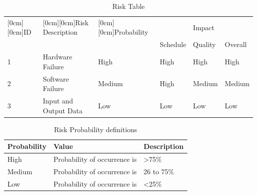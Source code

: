\documentclass[12pt,a4paper]
{article}
\numberwithin{table}{section}
\begin{document}
{{{{{\begin{table}[htbp]
\begin{center}
\begin{tabular}{|p{26pt}|p{136pt}|p{70pt}|l|l|l|}
\hline
\raisebox{-1.50ex}[0cm][0cm]{ID}& 
\raisebox{-1.50ex}[0cm][0cm]{Risk Description}& 
\raisebox{-1.50ex}[0cm][0cm]{Probability}& 
& 
Impact& 
 \\
\cline{4-6} 
 & 
 & 
 & 
Schedule& 
Quality& 
Overall \\
\hline
1& 
Hardware Failure& 
High& 
High& 
High& 
High \\
\hline
2& 
Software Failure& 
Medium& 
High& 
Medium& 
Medium \\
\hline
3& 
Input and Output Data & 
Low& 
Low& 
Low& 
Low \\
\hline
\end{tabular}
\caption{Risk Table}
\label{tab1}
\end{center}
\end{table}



\begin{table}[htbp]
\begin{center}
\begin{tabular}{|p{71pt}|l|l|}
\hline
Probability& 
Value& 
Description \\
\hline
High& 
Probability of occurrence is& 
\textgreater 75{\%} \\
\hline
Medium& 
Probability of occurrence is& 
26 to 75{\%} \\
\hline
Low& 
Probability of occurrence is& 
\textless 25{\%} \\
\hline
\end{tabular}
\caption{Risk Probability definitions}
\label{tab1}
\end{center}
\end{table}


}}}}}
\end{document}
